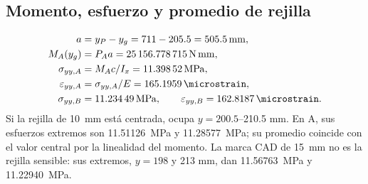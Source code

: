 \documentclass[11pt,a4paper]{article}
\begin{document}
\subsection{Momento, esfuerzo y promedio de rejilla}
\begin{align}
a&=y_P-y_g=711-205.5=\SI{505.5}{mm},\\
M_A(y_g)&=P_Aa=\SI{25156.778715}{N.mm},\\
\sigma_{yy,A}&=M_Ac/I_x=\SI{11.39852}{MPa},\\
\varepsilon_{yy,A}&=\sigma_{yy,A}/E=\SI{165.1959}{\microstrain},\\
\sigma_{yy,B}&=\SI{11.23449}{MPa},\qquad\varepsilon_{yy,B}=\SI{162.8187}{\microstrain}.
\end{align}
Si la rejilla de \SI{10}{mm} está centrada, ocupa $y=200.5$--210.5 mm. En A, sus esfuerzos extremos son \SI{11.51126}{MPa} y \SI{11.28577}{MPa}; su promedio coincide con el valor central por la linealidad del momento. La marca CAD de \SI{15}{mm} no es la rejilla sensible: sus extremos, $y=198$ y 213 mm, dan \SI{11.56763}{MPa} y \SI{11.22940}{MPa}.
\end{document}
